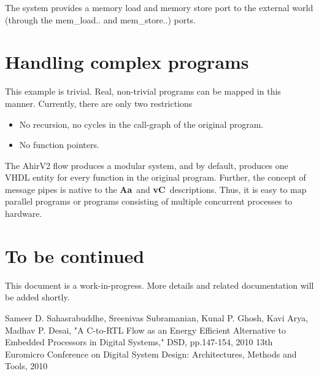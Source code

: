 \documentclass{article}
\newcommand{\Aa}{{\bf Aa}~}
\newcommand{\vC}{{\bf vC}~}
\begin{document}
The system provides a memory load and memory store
port to the external world (through the mem\_load.. and mem\_store..)
ports.

\section{Handling complex programs}

This example is trivial.  Real, non-trivial programs can be
mapped in this manner.  Currently, there are only
two restrictions
\begin{itemize}
\item No recursion, no cycles in the call-graph of the original
program.
\item No function pointers.
\end{itemize}

The AhirV2 flow produces a modular system, and by default,
produces one VHDL entity for every function in the original
program.  Further, the concept of message pipes is native
to the \Aa and \vC descriptions.  Thus, it is easy to
map parallel programs or programs consisting of multiple
concurrent processes to hardware.

\section{To be continued}

This document is a work-in-progress.  More details and
related documentation will be added shortly.

\begin{thebibliography}{99}
Sameer D. Sahasrabuddhe, Sreenivas Subramanian, Kunal P. Ghosh, Kavi Arya, Madhav P. Desai, 
"A C-to-RTL Flow as an Energy Efficient Alternative to Embedded Processors in Digital Systems," 
DSD, pp.147-154, 2010 13th Euromicro Conference on Digital 
System Design: Architectures, Methods and Tools, 2010
\end{thebibliography}
\end{document}
